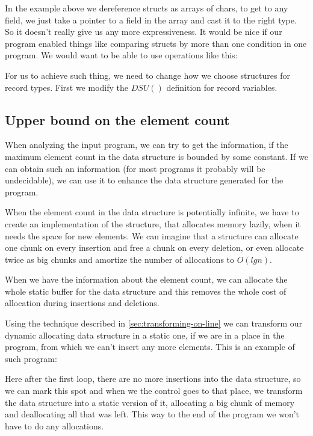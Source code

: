 \documentclass[11pt]{article}
\begin{document}
			

			In the example above we dereference structs as arrays of chars, to get to any field, we just
			take a pointer to a field in the array and cast it to the right type. So it doesn't really give
			us any more expressiveness. It would be nice if our program enabled things like comparing
			structs by more than one condition in one program. We would want to be able to use operations
			like this:

			

			For us to achieve such thing, we need to change how we choose structures for record types. First
			we modify the $DSU()$ definition for record variables.

	\subsection{Upper bound on the element count}

		When analyzing the input program, we can try to get the information, if the maximum element count in the
		data structure is bounded by some constant. If we can obtain such an information (for most programs it
		probably will be undecidable), we can use it to enhance the data structure generated for the program.

		When the element count in the data structure is potentially infinite, we have to create an
		implementation of the structure, that allocates memory lazily, when it needs the space for new elements.
		We can imagine that a structure can allocate one chunk on every insertion and free a chunk on every
		deletion, or even allocate twice as big chunks and amortize the number of allocations to $O(lg n)$.

		When we have the information about the element count, we can allocate the whole static buffer for the
		data structure and this removes the whole cost of allocation during insertions and deletions.

		Using the technique described in \autoref{sec:transforming-on-line} we can transform our dynamic
		allocating data structure in a static one, if we are in a place in the program, from which we can't
		insert any more elements. This is an example of such program:

		

		Here after the first loop, there are no more insertions into the data structure, so we can mark this
		spot and when we the control goes to that place, we transform the data structure into a static version
		of it, allocating a big chunk of memory and deallocating all that was left. This way to the end of the
		program we won't have to do any allocations.
\end{document}
